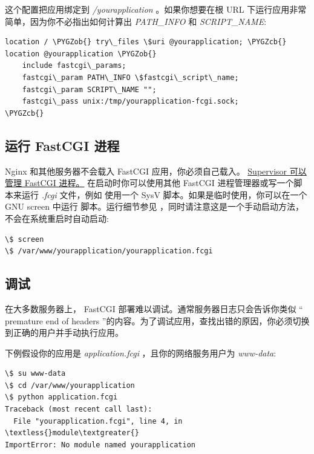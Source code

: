 \documentclass[a4paper,12pt]{sphinxmanual}
\def\PYGZob{\char`\{}
\def\PYGZcb{\char`\}}
\begin{document}
这个配置把应用绑定到 \emph{/yourapplication} 。如果你想要在根 URL 下运行应用非常
简单，因为你不必指出如何计算出 \emph{PATH\_INFO} 和 \emph{SCRIPT\_NAME}:

\begin{Verbatim}[commandchars=\\\{\}]
location / \PYGZob{} try\_files \$uri @yourapplication; \PYGZcb{}
location @yourapplication \PYGZob{}
    include fastcgi\_params;
    fastcgi\_param PATH\_INFO \$fastcgi\_script\_name;
    fastcgi\_param SCRIPT\_NAME "";
    fastcgi\_pass unix:/tmp/yourapplication-fcgi.sock;
\PYGZcb{}
\end{Verbatim}


\subsection{运行 FastCGI 进程}
\label{deploying/fastcgi:id1}
Nginx 和其他服务器不会载入 FastCGI 应用，你必须自己载入。 \href{http://supervisord.org/configuration.html\#fcgi-program-x-section-settings}{Supervisor 可以管理
FastCGI 进程。}
在启动时你可以使用其他 FastCGI 进程管理器或写一个脚本来运行 \emph{.fcgi} 文件，例如
使用一个 SysV  脚本。如果是临时使用，你可以在一个 GNU screen 中运行
 脚本。运行细节参见  ，同时请注意这是一个手动启动方法，
不会在系统重启时自动启动:

\begin{Verbatim}[commandchars=\\\{\}]
\$ screen
\$ /var/www/yourapplication/yourapplication.fcgi
\end{Verbatim}


\subsection{调试}
\label{deploying/fastcgi:id2}
在大多数服务器上， FastCGI 部署难以调试。通常服务器日志只会告诉你类似
“ premature end of headers ”的内容。为了调试应用，查找出错的原因，你必须切换
到正确的用户并手动执行应用。

下例假设你的应用是 \emph{application.fcgi} ，且你的网络服务用户为 \emph{www-data}:

\begin{Verbatim}[commandchars=\\\{\}]
\$ su www-data
\$ cd /var/www/yourapplication
\$ python application.fcgi
Traceback (most recent call last):
  File "yourapplication.fcgi", line 4, in \textless{}module\textgreater{}
ImportError: No module named yourapplication
\end{Verbatim}
\end{document}
